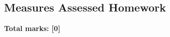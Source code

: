 \documentclass[../s1]{subfiles}
\begin{document}
\subsection*{Measures Assessed Homework}
\thispagestyle{fancy}



\begin{flushright}
\textbf{Total marks: [0]}
\end{flushright}
\end{document}
